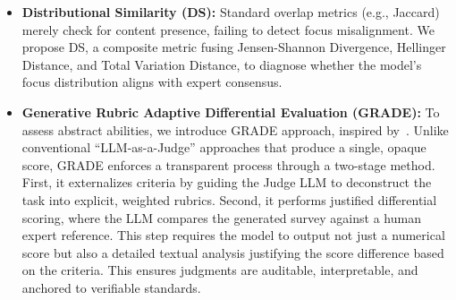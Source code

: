 \documentclass[11pt]{article}
\begin{document}
\begin{itemize}[leftmargin=0.2cm, itemsep=0pt, parsep=0pt]
    \item \textbf{Distributional Similarity (DS):} Standard overlap metrics (e.g., Jaccard) merely check for content presence, failing to detect focus misalignment. We propose DS, a composite metric fusing Jensen-Shannon Divergence, Hellinger Distance, and Total Variation Distance, to diagnose whether the model's focus distribution aligns with expert consensus.

    \item \textbf{Generative Rubric Adaptive Differential Evaluation (GRADE):} To assess abstract abilities, we introduce GRADE approach, inspired by~\cite{du2025deepresearch}. Unlike conventional ``LLM-as-a-Judge'' approaches that produce a single, opaque score, GRADE enforces a transparent process through a two-stage method. First, it externalizes criteria by guiding the Judge LLM to deconstruct the task into explicit, weighted rubrics. Second, it performs justified differential scoring, where the LLM compares the generated survey against a human expert reference. This step requires the model to output not just a numerical score but also a detailed textual analysis justifying the score difference based on the criteria. This ensures judgments are auditable, interpretable, and anchored to verifiable standards.
\end{itemize}
\end{document}
